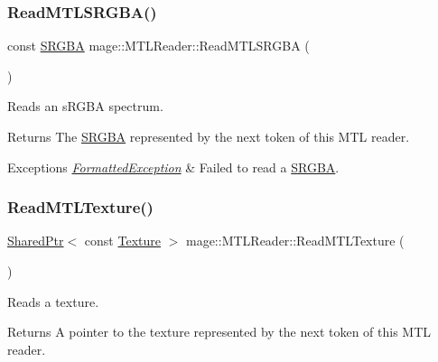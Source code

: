 \subsubsection{\texorpdfstring{Read\+M\+T\+L\+S\+R\+G\+B\+A()}{ReadMTLSRGBA()}}
{\footnotesize\ttfamily const \hyperlink{structmage_1_1_s_r_g_b_a}{S\+R\+G\+BA} mage\+::\+M\+T\+L\+Reader\+::\+Read\+M\+T\+L\+S\+R\+G\+BA (\begin{DoxyParamCaption}{ }\end{DoxyParamCaption})\hspace{0.3cm}{\ttfamily [private]}}

Reads an s\+R\+G\+BA spectrum.

\begin{DoxyReturn}{Returns}
The {\ttfamily \hyperlink{structmage_1_1_s_r_g_b_a}{S\+R\+G\+BA}} represented by the next token of this M\+TL reader. 
\end{DoxyReturn}

\begin{DoxyExceptions}{Exceptions}
{\em \hyperlink{classmage_1_1_formatted_exception}{Formatted\+Exception}} & Failed to read a {\ttfamily \hyperlink{structmage_1_1_s_r_g_b_a}{S\+R\+G\+BA}}. \\
\hline
\end{DoxyExceptions}
\hypertarget{classmage_1_1_m_t_l_reader_a36dd3bbfd989698c9caeacc059d03e69}{}\label{classmage_1_1_m_t_l_reader_a36dd3bbfd989698c9caeacc059d03e69} 
\subsubsection{\texorpdfstring{Read\+M\+T\+L\+Texture()}{ReadMTLTexture()}}
{\footnotesize\ttfamily \hyperlink{namespacemage_a1e01ae66713838a7a67d30e44c67703e}{Shared\+Ptr}$<$ const \hyperlink{classmage_1_1_texture}{Texture} $>$ mage\+::\+M\+T\+L\+Reader\+::\+Read\+M\+T\+L\+Texture (\begin{DoxyParamCaption}{ }\end{DoxyParamCaption})\hspace{0.3cm}{\ttfamily [private]}}

Reads a texture.

\begin{DoxyReturn}{Returns}
A pointer to the texture represented by the next token of this M\+TL reader. 
\end{DoxyReturn}

